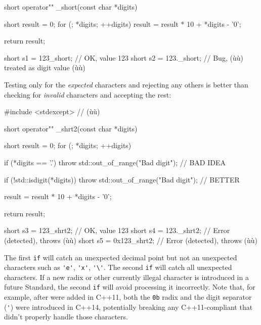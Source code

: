 \begin{emcppslisting}
short operator"" _short(const char *digits)
{
    short result = 0;
    for (; *digits; ++digits)
    {
        result = result * 10 + *digits - '0';
    }

    return result;
}

short s1 = 123_short;   // OK, value 123
short s2 = 123._short;  // Bug, (ù{}ù) treated as digit value (ù{}ù)
\end{emcppslisting}

\noindent Testing only for the \emph{expected} characters and rejecting any others
is better than checking for \emph{invalid} characters and accepting the
rest:

\begin{emcppslisting}
#include <stdexcept>  // (ù{}ù)

short operator"" _shrt2(const char *digits)
{
    short result = 0;
    for (; *digits; ++digits)
    {
        if (*digits == '.')
        {
            throw std::out_of_range("Bad digit");  // BAD IDEA
        }

        if (!std::isdigit(*digits))
        {
            throw std::out_of_range("Bad digit");  // BETTER
        }

        result = result * 10 + *digits - '0';
    }

    return result;
}

short s3 = 123_shrt2;    // OK, value 123
short s4 = 123._shrt2;   // Error (detected), throws (ù{}ù)
short s5 = 0x123_shrt2;  // Error (detected), throws (ù{}ù)
\end{emcppslisting}

\noindent The first \lstinline!if! will catch an unexpected decimal point but not an
unexpected characters such as \lstinline!'e'!, \lstinline!'x'!, \lstinline!'\'!. The second \lstinline!if! will catch all unexpected characters. If a
new radix or other currently illegal character is introduced in a future
Standard, the second \lstinline!if! will avoid processing it incorrectly.
Note that, for example, after  were added in C++11, both
the \lstinline!0b! radix and the digit separator (\lstinline!'!) were
introduced in C++14, potentially breaking any C++11-compliant
 that didn't properly handle those characters.


